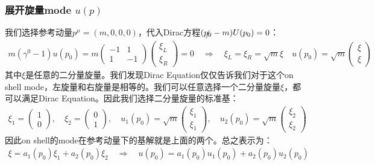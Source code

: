 \subsubsection{展开旋量mode $ u(p) $}


我们选择参考动量$ p^\mu = (m,0,0,0) $，代入Dirac方程$ (\slashed{p_0}-m)U(p_0) = 0 $：
\begin{align}
  m\left(\gamma^0-1\right)u(p_0)=m
  \begin{pmatrix}-1&1\\1&-1
  \end{pmatrix}
  \begin{pmatrix}\xi_L\\\xi_R
  \end{pmatrix}=0 \quad \Rightarrow\quad\xi_L=\xi_R=\sqrt{m}\xi\quad
  u(p_0)=\sqrt{m}
  \begin{pmatrix}\xi\\\xi
  \end{pmatrix}
\end{align}
其中$ \xi $是任意的二分量旋量。我们发现Dirac Equation仅仅告诉我们对于这个on shell
mode，左旋量和右旋量是相等的。我们可以任意选择一个二分量旋量$ \xi $，都可以满足Dirac Equation。因此我们选择二分量旋量的标准基：
\begin{align}
  \xi_1=
  \begin{pmatrix}1\\0
  \end{pmatrix},\quad \xi_2=
  \begin{pmatrix}0\\1
  \end{pmatrix} , \quad u_1(p_0)=\sqrt{m}
  \begin{pmatrix}\xi_1 \\ \xi_1
  \end{pmatrix},\quad u_2(p_0)=\sqrt{m}
  \begin{pmatrix}\xi_2 \\ \xi_2
  \end{pmatrix}
\end{align}
因此on shell的mode在参考动量下的基解就是上面的两个。总之表示为：
\begin{align}
  \xi = a_1(p_0)\xi_1 + a_2(p_0)\xi_2 \quad \Rightarrow \quad
  u(p_0)=a_1(p_0)u_1(p_0)+a_2(p_0)u_2(p_0)
\end{align}

\bigskip
{}

